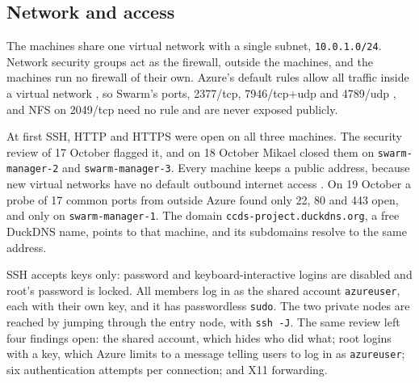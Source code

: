 \subsection{Network and access}
\label{sec:infra-network}

The machines share one virtual network with a single subnet,
\texttt{10.0.1.0/24}. Network security groups act as the firewall,
outside the machines, and the machines run no firewall of their own.
Azure's default rules allow all traffic inside a virtual network
\parencite{azure-nsg}, so Swarm's ports, 2377/tcp, 7946/tcp+udp and
4789/udp \parencite{llusa2026orchestration}, and NFS on 2049/tcp need no
rule and are never exposed publicly.

At first SSH, HTTP and HTTPS were open on all three machines. The
security review of 17 October flagged it, and on 18 October Mikael
closed them on \texttt{swarm-manager-2} and \texttt{swarm-manager-3}.
Every machine keeps a public address, because new virtual networks have
no default outbound internet access \parencite{azure-default-outbound}.
On 19 October a probe of 17 common ports from outside Azure found only
22, 80 and 443 open, and only on \texttt{swarm-manager-1}. The domain
\texttt{ccds-project.duckdns.org}, a free DuckDNS name, points to that
machine, and its subdomains resolve to the same address.

SSH accepts keys only: password and keyboard-interactive logins are
disabled and root's password is locked. All members log in as the shared
account \texttt{azureuser}, each with their own key, and it has
passwordless \texttt{sudo}. The two private nodes are reached by jumping
through the entry node, with \texttt{ssh -J}. The same review left four
findings open: the shared account, which hides who did what; root logins
with a key, which Azure limits to a message telling users to log in as
\texttt{azureuser}; six authentication attempts per connection; and X11
forwarding.

